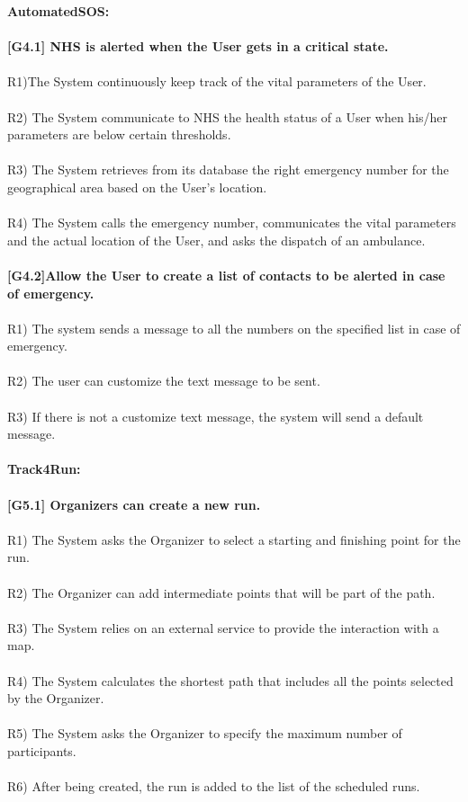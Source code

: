 \textbf{AutomatedSOS:} \\ \\ 
\textbf{[G4.1] NHS is alerted when the User gets in a critical state.} \\ \\
R1)The System continuously keep track of the vital parameters of the User. \\ \\
R2) The System communicate to NHS the health status of a User when his/her parameters are below certain thresholds. \\ \\
R3) The System retrieves from its database the right emergency number for the geographical area based on the User’s location. \\ \\
R4) The System calls the emergency number, communicates the vital parameters and the actual location of the User, and asks the dispatch of an ambulance. \\ \\

\textbf{[G4.2]Allow the User to create a list of contacts to be alerted in case of emergency.} \\ \\
R1) The system sends a message to all the numbers on the specified list in case of emergency. \\ \\
R2) The user can customize the  text message to be sent. \\ \\
R3) If there is not a customize text message, the system will send a default message. \\ \\

\textbf{Track4Run:}\\ \\
\textbf{[G5.1] Organizers can create a new run.} \\ \\
R1) The System asks the Organizer to select a starting and finishing point for the run. \\ \\
R2) The Organizer can add intermediate points that will be part of the path. \\ \\
R3) The System relies on an external service to provide the interaction with a map. \\ \\
R4) The System calculates the shortest path that includes all the points selected by the Organizer. \\ \\   
R5) The System asks the Organizer to specify the maximum number of participants. \\ \\
R6) After being created, the run is added to the list of the scheduled runs. \\ \\


